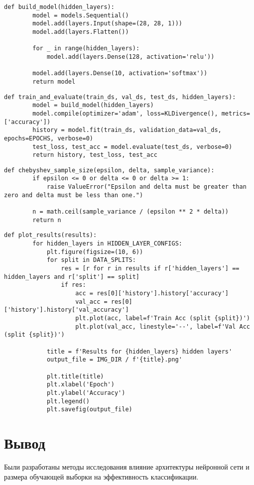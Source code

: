 \begin{lstlisting}[caption={Создание модели}]
    def build_model(hidden_layers):
        model = models.Sequential()
        model.add(layers.Input(shape=(28, 28, 1))) 
        model.add(layers.Flatten())

        for _ in range(hidden_layers):
            model.add(layers.Dense(128, activation='relu'))

        model.add(layers.Dense(10, activation='softmax'))
        return model
\end{lstlisting}

\begin{lstlisting}[caption={Обучение и оценка модели}]
    def train_and_evaluate(train_ds, val_ds, test_ds, hidden_layers):
        model = build_model(hidden_layers)
        model.compile(optimizer='adam', loss=KLDivergence(), metrics=['accuracy'])
        history = model.fit(train_ds, validation_data=val_ds, epochs=EPOCHS, verbose=0)
        test_loss, test_acc = model.evaluate(test_ds, verbose=0)
        return history, test_loss, test_acc
\end{lstlisting}

\begin{lstlisting}[caption={Функция расчета размера выборки по неравенству Чебышева}]
    def chebyshev_sample_size(epsilon, delta, sample_variance):
        if epsilon <= 0 or delta <= 0 or delta >= 1:
            raise ValueError("Epsilon and delta must be greater than zero and delta must be less than one.")

        n = math.ceil(sample_variance / (epsilon ** 2 * delta))
        return n
\end{lstlisting}

\begin{lstlisting}[caption={Визуализизация результатов обучения}]
    def plot_results(results):
        for hidden_layers in HIDDEN_LAYER_CONFIGS:
            plt.figure(figsize=(10, 6))
            for split in DATA_SPLITS:
                res = [r for r in results if r['hidden_layers'] == hidden_layers and r['split'] == split]
                if res:
                    acc = res[0]['history'].history['accuracy']
                    val_acc = res[0]['history'].history['val_accuracy']
                    plt.plot(acc, label=f'Train Acc (split {split})')
                    plt.plot(val_acc, linestyle='--', label=f'Val Acc (split {split})')

            title = f'Results for {hidden_layers} hidden layers'
            output_file = IMG_DIR / f'{title}.png'

            plt.title(title)
            plt.xlabel('Epoch')
            plt.ylabel('Accuracy')
            plt.legend()
            plt.savefig(output_file)
\end{lstlisting}

\section*{Вывод}

Были разработаны методы исследования влияние архитектуры нейронной сети и размера обучающей выборки на эффективность классификации.

\clearpage
